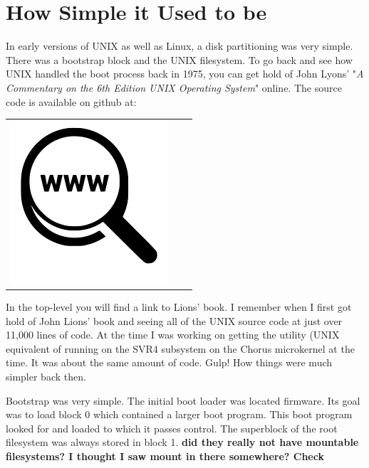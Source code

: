 
\section{How Simple it Used to be}

In early versions of UNIX as well as Linux, a disk partitioning was very simple. There was a bootstrap block and the UNIX  filesystem. To go back and see how UNIX handled the boot process back in 1975, you can get hold of John Lyons' "\textit{A Commentary on the 6th Edition UNIX Operating System}" online. The source code is available on github at: 

\begin{table}[h]
\begin{tabular}{lcl}
\parbox[r]{0.5in}{ \includegraphics[scale=0.15]{figures/url.png}} & \parbox[l]{0.1in}{} & \parbox[l]{3in}{}
\end{tabular}
\end{table}

\noindent
In the top-level  you will find a link to Lions' book. I remember when I first got hold of John Lions' book and seeing all of the UNIX source code at just over 11,000 lines of code. At the time I was working on getting the  utility (UNIX equivalent of  running on the SVR4 subsystem on the Chorus microkernel at the time. It was about the same amount of code. Gulp! How things were much simpler back then.

Bootstrap was very simple. The initial boot loader was located firmware. Its goal was to load block 0 which contained a larger boot program. This boot program looked for and loaded  to which it passes control. The superblock of the root filesystem was always stored in block 1. \textbf{did they really not have mountable filesystems? I thought I saw mount in there somewhere? Check}

